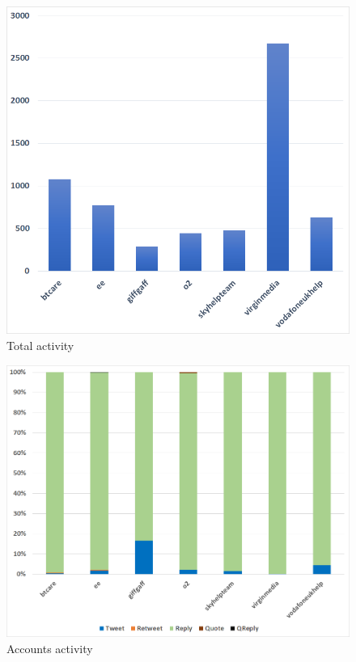\documentclass[sigconf]{acmart}
\begin{document}
\begin{figure}[htb]
\centering
\includegraphics[width=\columnwidth]{images/totalactivity.png}
\caption{Total activity}
\label{fig:totalactivity}
\end{figure}

\begin{figure}[htb]
\centering
\includegraphics[width=\columnwidth]{images/accountsactivity.png}
\caption{Accounts activity}
\label{fig:accountsactivity}
\end{figure}
\end{document}

